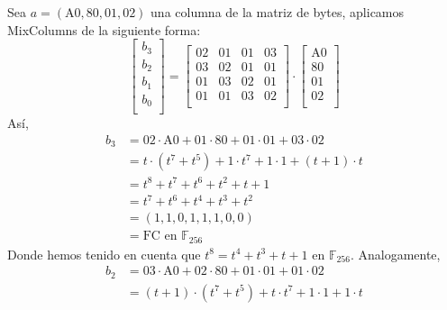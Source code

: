     \begin{ejemplo} \cite{cryptoSchool}
        Sea $a = (\text{A}0, 80, 01, 02)$ una columna de la matriz de bytes, aplicamos MixColumns de la siguiente forma:
        \begin{equation}
            \begin{bmatrix}
                b_{3} \\
                b_{2} \\
                b_{1} \\
                b_{0} \\
            \end{bmatrix}
            = 
            \begin{bmatrix}
                02 & 01 & 01 & 03 \\
                03 & 02 & 01 & 01 \\
                01 & 03 & 02 & 01 \\
                01 & 01 & 03 & 02 \\
            \end{bmatrix}
            \cdot
            \begin{bmatrix}
                \text{A}0 \\
                80 \\
                01 \\
                02 \\
            \end{bmatrix}
        \end{equation}
        Así, 
        \begin{align}
            b_{3} &= 02 \cdot \text{A}0 + 01 \cdot 80 + 01 \cdot 01 + 03 \cdot 02 \\
            &= t \cdot (t^{7} + t^{5}) + 1 \cdot t^{7} + 1 \cdot 1 + (t + 1) \cdot t \\
            &= t^{8} + t^{7} + t^{6} + t^{2} + t + 1 \\
            &= t^{7} + t^{6} + t^{4} + t^{3} + t^{2} \\
            &= (1, 1, 0, 1, 1, 1, 0, 0) \\
            &= \text{FC en } \mathbb{F}_{256}
        \end{align}
        Donde hemos tenido en cuenta que $t^{8} = t^{4} + t^{3} + t + 1$ en $\mathbb{F}_{256}$. Analogamente,
        \begin{align}
            b_{2} &= 03 \cdot \text{A}0 + 02 \cdot 80 + 01 \cdot 01 + 01 \cdot 02 \\
            &= (t + 1) \cdot (t^{7} + t^{5}) + t \cdot t^{7} + 1 \cdot 1 + 1 \cdot t \\

\end{align}
\end{ejemplo}
